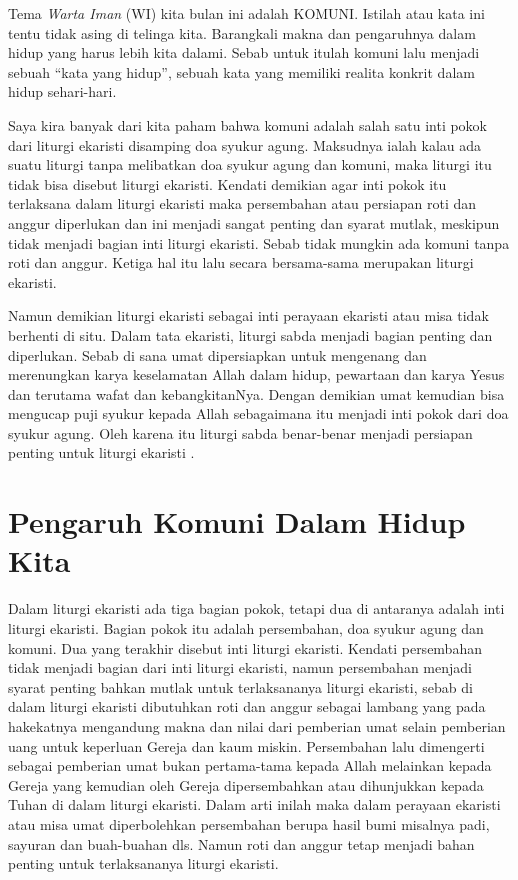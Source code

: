 


        Tema \textit{Warta Iman} (WI) kita bulan ini adalah KOMUNI. Istilah atau kata ini tentu  tidak asing di telinga kita. Barangkali makna dan pengaruhnya dalam hidup yang harus lebih kita dalami. Sebab untuk itulah  komuni lalu menjadi sebuah ``kata yang hidup'', sebuah kata yang memiliki realita konkrit dalam hidup  sehari-hari.

       Saya kira banyak dari kita paham bahwa komuni adalah salah satu  inti pokok dari liturgi ekaristi disamping doa syukur agung. Maksudnya ialah kalau ada suatu  liturgi tanpa melibatkan doa syukur agung dan komuni, maka liturgi itu tidak bisa disebut liturgi ekaristi. Kendati demikian agar inti pokok itu terlaksana dalam liturgi ekaristi maka persembahan atau persiapan roti dan anggur diperlukan dan ini menjadi sangat penting dan syarat mutlak, meskipun tidak menjadi bagian inti liturgi ekaristi. Sebab tidak mungkin ada komuni tanpa  roti dan anggur. Ketiga hal itu lalu secara bersama-sama  merupakan liturgi ekaristi.

      Namun demikian liturgi ekaristi sebagai inti perayaan ekaristi atau misa tidak berhenti di situ. Dalam tata ekaristi, liturgi sabda menjadi bagian penting dan diperlukan. Sebab di sana umat dipersiapkan untuk mengenang dan merenungkan karya keselamatan Allah dalam hidup, pewartaan dan karya Yesus dan terutama wafat dan kebangkitanNya. Dengan demikian umat kemudian bisa mengucap puji syukur kepada Allah sebagaimana itu menjadi inti pokok dari doa syukur agung. Oleh karena itu liturgi sabda benar-benar menjadi persiapan penting untuk liturgi ekaristi .

\section*{Pengaruh Komuni Dalam Hidup Kita}
      Dalam liturgi ekaristi ada tiga bagian pokok, tetapi dua di antaranya adalah inti liturgi ekaristi. Bagian pokok itu adalah persembahan, doa syukur agung dan komuni. Dua yang terakhir disebut inti liturgi ekaristi. Kendati persembahan tidak menjadi bagian dari inti liturgi ekaristi, namun persembahan menjadi syarat penting bahkan mutlak untuk terlaksananya liturgi ekaristi, sebab di dalam liturgi ekaristi dibutuhkan  roti dan anggur sebagai lambang yang pada hakekatnya mengandung makna dan nilai dari pemberian umat selain pemberian uang untuk keperluan Gereja dan kaum miskin. Persembahan lalu dimengerti sebagai pemberian umat bukan pertama-tama kepada Allah melainkan kepada Gereja yang kemudian oleh Gereja dipersembahkan atau dihunjukkan kepada Tuhan  di dalam liturgi ekaristi. Dalam arti inilah maka dalam perayaan ekaristi atau misa umat diperbolehkan  persembahan berupa hasil bumi misalnya padi, sayuran dan buah-buahan dls. Namun roti dan anggur tetap menjadi bahan penting untuk terlaksananya liturgi ekaristi. 

